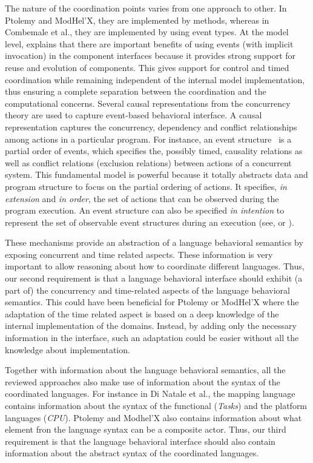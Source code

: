 {The nature of the coordination points varies from one approach to other. In Ptolemy and ModHel'X, they are implemented by methods, whereas in Combemale et al., they are implemented by using event types. At the model level, \cite{garlansoftarchbib} explains that there are important benefits of using events (with implicit invocation) in the component interfaces because it provides strong support for reuse and evolution of components. This gives support for control and timed coordination while remaining independent of the internal model implementation, thus ensuring a complete separation between the coordination and the computational concerns. Several causal representations from the concurrency theory are used to capture event-based behavioral interface. A causal representation captures the concurrency, dependency and conflict relationships among actions in a particular program. For instance, an event structure~\cite{eventStructures} is a partial order of events, which specifies the, possibly timed, causality relations as well as conflict relations (\ie exclusion relations) between actions of a concurrent system. This fundamental model is powerful because it totally abstracts data and program structure to focus on the partial ordering of actions. It specifies, \emph{in extension} and \emph{in order}, the set of actions that can be observed during the program execution. An event structure can also be specified \emph{in intention} to represent the set of observable event structures during an execution (see, \eg\cite{ccslbib} or \cite{tagmachinebib}). 

These mechanisms provide an abstraction of a language behavioral semantics by exposing concurrent and time related aspects. These information is very important to allow reasoning about how to coordinate different languages. Thus, our second requirement is that a language behavioral interface should exhibit (a part of) the concurrency and time-related aspects of the language behavioral semantics. This could have been beneficial for Ptolemy or ModHel'X where the adaptation of the time related aspect is based on a deep knowledge of the internal implementation of the domains. Instead, by adding only the necessary information in the interface, such an adaptation could be easier without all the knowledge about implementation. 

Together with information about the language behavioral semantics, all the reviewed approaches also make use of information about the syntax of the coordinated languages. For instance in Di Natale et al., the mapping language contains information about the syntax of the functional (\eg \emph{Tasks}) and the platform languages (\eg \emph{CPU}). Ptolemy and Modhel'X also contains information about what element fron the language syntax can be a composite actor. Thus, our third requirement is that the language behavioral interface should also contain information about the abstract syntax of the coordinated languages.      

}

